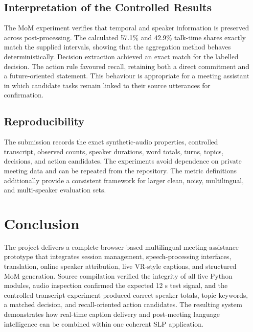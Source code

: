 \documentclass[conference]{IEEEtran}
\begin{document}
\subsection{Interpretation of the Controlled Results}
The MoM experiment verifies that temporal and speaker information is preserved across post-processing. The calculated 57.1\% and 42.9\% talk-time shares exactly match the supplied intervals, showing that the aggregation method behaves deterministically. Decision extraction achieved an exact match for the labelled decision. The action rule favoured recall, retaining both a direct commitment and a future-oriented statement. This behaviour is appropriate for a meeting assistant in which candidate tasks remain linked to their source utterances for confirmation.

\subsection{Reproducibility}
The submission records the exact synthetic-audio properties, controlled transcript, observed counts, speaker durations, word totals, turns, topics, decisions, and action candidates. The experiments avoid dependence on private meeting data and can be repeated from the repository. The metric definitions additionally provide a consistent framework for larger clean, noisy, multilingual, and multi-speaker evaluation sets.

\section{Conclusion}
The project delivers a complete browser-based multilingual meeting-assistance prototype that integrates session management, speech-processing interfaces, translation, online speaker attribution, live VR-style captions, and structured MoM generation. Source compilation verified the integrity of all five Python modules, audio inspection confirmed the expected 12 s test signal, and the controlled transcript experiment produced correct speaker totals, topic keywords, a matched decision, and recall-oriented action candidates. The resulting system demonstrates how real-time caption delivery and post-meeting language intelligence can be combined within one coherent SLP application.
\end{document}
